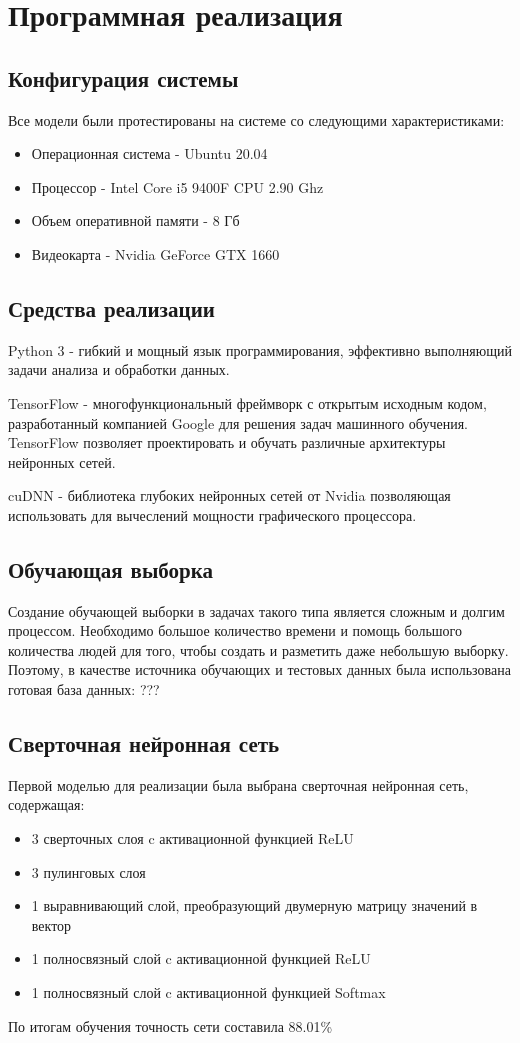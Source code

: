 \section{Программная реализация}

\subsection{Конфигурация системы}
Все модели были протестированы на системе со следующими характеристиками:
\begin{itemize}
  \item Операционная система - Ubuntu 20.04
  \item Процессор - Intel Core i5 9400F CPU 2.90 Ghz
  \item Объем оперативной памяти - 8 Гб
  \item Видеокарта - Nvidia GeForce GTX 1660
\end{itemize}

\subsection{Средства реализации}
Python 3 - гибкий и мощный язык программирования, эффективно выполняющий задачи анализа и обработки данных. 

TensorFlow - многофункциональный фреймворк с открытым исходным кодом, разработанный компанией Google для решения задач машинного обучения. TensorFlow позволяет проектировать и обучать различные архитектуры нейронных сетей.

cuDNN - библиотека глубоких нейронных сетей от Nvidia позволяющая использовать для вычеслений мощности графического процессора. 
\subsection{Обучающая выборка}
Создание обучающей выборки в задачах такого типа является сложным
и долгим процессом. Необходимо большое количество времени и помощь
большого количества людей для того, чтобы создать и разметить
даже небольшую выборку.
Поэтому, в качестве источника обучающих и тестовых данных была использована готовая база данных: ??? 

\subsection{Сверточная нейронная сеть}
Первой моделью для реализации была выбрана сверточная нейронная сеть, содержащая:
\begin{itemize}
  \item 3 сверточных слоя c активационной функцией ReLU
  \item 3 пулинговых слоя
  \item 1 выравнивающий слой, преобразующий двумерную матрицу значений в вектор
  \item 1 полносвязный слой c активационной функцией ReLU
  \item 1 полносвязный слой c активационной функцией Softmax
\end{itemize}

По итогам обучения точность сети составила 88.01\%
\clearpage